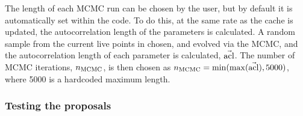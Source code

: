 The length of each MCMC run can be chosen by the user, but by default it is automatically set within the code. To do this,
at the same rate as the cache is updated, the autocorrelation length of the parameters is calculated. A random sample from the current
live points in chosen, and evolved via the MCMC, and the autocorrelation length of each parameter is calculated, $\vec{{\rm acl}}$. The number
of MCMC iterations, $n_{\rm MCMC}$, is then chosen as $n_{\rm MCMC} = {\rm min}({\rm max}(\vec{{\rm acl}}), 5000)$, where 5000 is
a hardcoded maximum length.

\subsubsection{Testing the proposals}\label{sec:proposaltesting}

